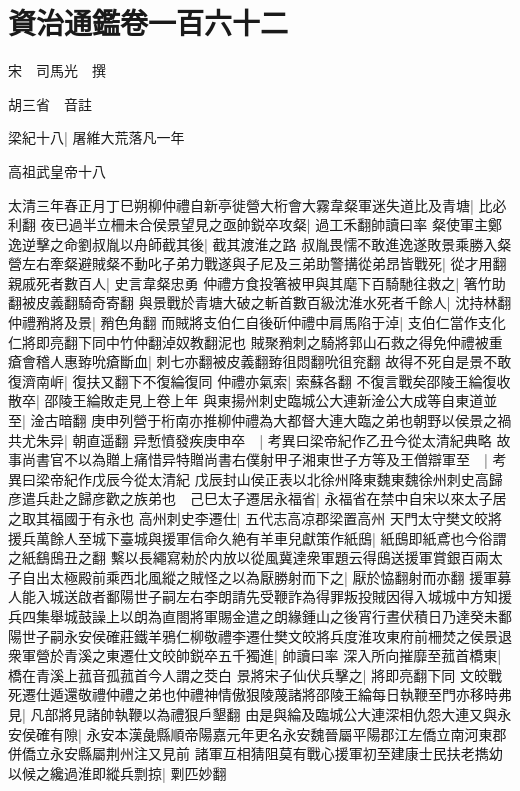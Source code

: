 \chapter{資治通鑑卷一百六十二}
宋　司馬光　撰

胡三省　音註

梁紀十八|{
	屠維大荒落凡一年}


高祖武皇帝十八

太清三年春正月丁巳朔柳仲禮自新亭徙營大桁會大霧韋粲軍迷失道比及青塘|{
	比必利翻}
夜已過半立柵未合侯景望見之亟帥鋭卒攻粲|{
	過工禾翻帥讀曰率}
粲使軍主鄭逸逆擊之命劉叔胤以舟師截其後|{
	截其渡淮之路}
叔胤畏懦不敢進逸遂敗景乘勝入粲營左右牽粲避賊粲不動叱子弟力戰遂與子尼及三弟助警搆從弟昂皆戰死|{
	從才用翻}
親戚死者數百人|{
	史言韋粲忠勇}
仲禮方食投箸被甲與其麾下百騎馳往救之|{
	箸竹助翻被皮義翻騎奇寄翻}
與景戰於青塘大破之斬首數百級沈淮水死者千餘人|{
	沈持林翻}
仲禮矟將及景|{
	矟色角翻}
而賊將支伯仁自後斫仲禮中肩馬陷于淖|{
	支伯仁當作支化仁將即亮翻下同中竹仲翻淖奴教翻泥也}
賊聚矟刺之騎將郭山石救之得免仲禮被重瘡會稽人惠臶吮瘡斷血|{
	刺七亦翻被皮義翻臶徂悶翻吮徂兖翻}
故得不死自是景不敢復濟南㟁|{
	復扶又翻下不復綸復同}
仲禮亦氣索|{
	索蘇各翻}
不復言戰矣邵陵王綸復收散卒|{
	邵陵王綸敗走見上卷上年}
與東揚州刺史臨城公大連新淦公大成等自東道並至|{
	淦古暗翻}
庚申列營于桁南亦推柳仲禮為大都督大連大臨之弟也朝野以侯景之禍共尤朱异|{
	朝直遥翻}
异慙憤發疾庚申卒　|{
	考異曰梁帝紀作乙丑今從太清紀典略}
故事尚書官不以為贈上痛惜异特贈尚書右僕射甲子湘東世子方等及王僧辯軍至　|{
	考異曰梁帝紀作戊辰今從太清紀}
戊辰封山侯正表以北徐州降東魏東魏徐州刺史高歸彦遣兵赴之歸彦歡之族弟也　己巳太子遷居永福省|{
	永福省在禁中自宋以來太子居之取其福國于有永也}
高州刺史李遷仕|{
	五代志高凉郡梁置高州}
天門太守樊文皎將援兵萬餘人至城下臺城與援軍信命久絶有羊車兒獻策作紙䲭|{
	紙䲭即紙鳶也今俗謂之紙鷂䲭丑之翻}
繫以長繩寫勑於内放以從風冀達衆軍題云得䲭送援軍賞銀百兩太子自出太極殿前乘西北風縱之賊怪之以為厭勝射而下之|{
	厭於恊翻射而亦翻}
援軍募人能入城送啟者鄱陽世子嗣左右李朗請先受鞭詐為得罪叛投賊因得入城城中方知援兵四集舉城鼓譟上以朗為直閤將軍賜金遣之朗緣鍾山之後宵行晝伏積日乃達癸未鄱陽世子嗣永安侯確莊鐵羊鴉仁柳敬禮李遷仕樊文皎將兵度淮攻東府前柵焚之侯景退衆軍營於青溪之東遷仕文皎帥鋭卒五千獨進|{
	帥讀曰率}
深入所向摧靡至菰首橋東|{
	橋在青溪上菰音孤菰首今人謂之茭白}
景將宋子仙伏兵擊之|{
	將即亮翻下同}
文皎戰死遷仕遁還敬禮仲禮之弟也仲禮神情傲狠陵蔑諸將邵陵王綸每日執鞭至門亦移時弗見|{
	凡部將見諸帥執鞭以為禮狠戶墾翻}
由是與綸及臨城公大連深相仇怨大連又與永安侯確有隙|{
	永安本漢彘縣順帝陽嘉元年更名永安魏晉屬平陽郡江左僑立南河東郡併僑立永安縣屬荆州注又見前}
諸軍互相猜阻莫有戰心援軍初至建康士民扶老擕幼以候之纔過淮即縱兵剽掠|{
	㔄匹妙翻}
